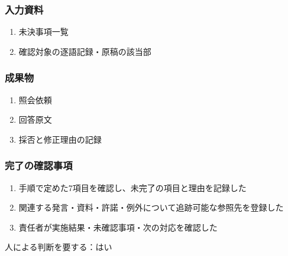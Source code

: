\documentclass[a4paper,11pt]{article}
\begin{document}
\subsubsection*{入力資料}
\begin{enumerate}[leftmargin=2em,itemsep=0.35em]
\item 未決事項一覧
\item 確認対象の逐語記録・原稿の該当部
\end{enumerate}
\subsubsection*{成果物}
\begin{enumerate}[leftmargin=2em,itemsep=0.35em]
\item 照会依頼
\item 回答原文
\item 採否と修正理由の記録
\end{enumerate}
\subsubsection*{完了の確認事項}
\begin{enumerate}[leftmargin=2em,itemsep=0.35em]
\item 手順で定めた7項目を確認し、未完了の項目と理由を記録した
\item 関連する発言・資料・許諾・例外について追跡可能な参照先を登録した
\item 責任者が実施結果・未確認事項・次の対応を確認した
\end{enumerate}
\par 人による判断を要する：はい\par\medskip
\end{document}
